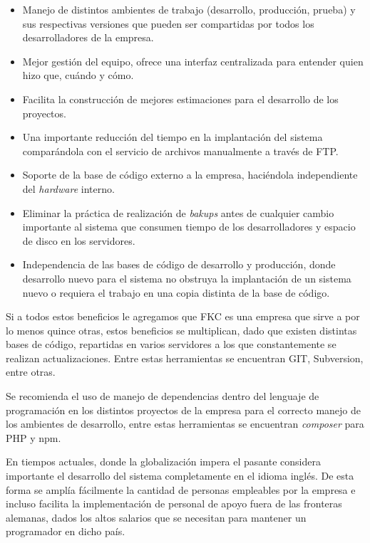\begin{itemize}
	\item Manejo de distintos ambientes de trabajo (desarrollo, producción, prueba) y sus respectivas versiones que pueden ser compartidas por todos los desarrolladores de la empresa.
	
	\item Mejor gestión del equipo, ofrece una interfaz centralizada para entender quien hizo que, cuándo y cómo.

	\item Facilita la construcción de mejores estimaciones para el desarrollo de los proyectos.

	\item Una importante reducción del tiempo en la implantación del sistema comparándola con el servicio de archivos manualmente a través de FTP.

	\item Soporte de la base de código externo a la empresa, haciéndola independiente del \emph{hardware} interno.

	\item Eliminar la práctica de realización de \emph{bakups} antes de cualquier cambio importante al sistema que consumen tiempo de los desarrolladores y espacio de disco en los servidores.

	\item Independencia de las bases de código de desarrollo y producción, donde desarrollo nuevo para el sistema no obstruya la implantación de un sistema nuevo o requiera el trabajo en una copia distinta de la base de código.
\end{itemize}

Si a todos estos beneficios le agregamos que \gls{FKC} es una empresa que sirve a por lo menos quince otras, estos beneficios se multiplican, dado que existen distintas bases de código, repartidas en varios servidores a los que constantemente se realizan actualizaciones. Entre estas herramientas se encuentran GIT, Subversion, entre otras.

Se recomienda el uso de manejo de dependencias dentro del lenguaje de programación en los distintos proyectos de la empresa para el correcto manejo de los ambientes de desarrollo, entre estas herramientas se encuentran \emph{composer} para PHP y npm. 

En tiempos actuales, donde la globalización impera el pasante considera importante el desarrollo del sistema completamente en el idioma inglés. De esta forma se amplía fácilmente la cantidad de personas empleables por la empresa e incluso facilita la implementación de personal de apoyo fuera de las fronteras alemanas, dados los altos salarios que se necesitan para mantener un programador en dicho país.

